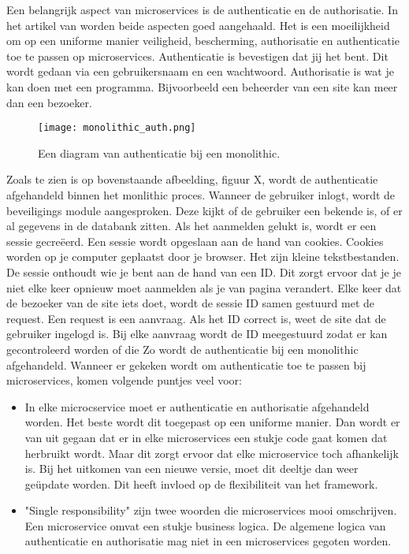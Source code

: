 Een belangrijk aspect van microservices is de authenticatie en de authorisatie. In het artikel van  \textcite{Ayoub2018} worden beide aspecten goed aangehaald. Het is een moeilijkheid om op een uniforme manier veiligheid, bescherming, authorisatie en authenticatie toe te passen op microservices. Authenticatie is bevestigen dat jij het bent. Dit wordt gedaan via een gebruikersnaam en een wachtwoord. Authorisatie is wat je kan doen met een programma. Bijvoorbeeld een beheerder van een site kan meer dan een bezoeker. 
\begin{figure}[h]
	\texttt{[image: monolithic\_auth.png]}
	\centering
	\caption{Een diagram van authenticatie bij een monolithic. \textcite{Ayoub2018}}
\end{figure}
Zoals te zien is op bovenstaande afbeelding, figuur X, wordt de authenticatie afgehandeld binnen het monlithic proces. Wanneer de gebruiker inlogt, wordt de beveiligings module aangesproken. Deze kijkt of de gebruiker een bekende is, of er al gegevens in de databank zitten. Als het aanmelden gelukt is, wordt er een sessie gecreëerd. Een sessie wordt opgeslaan aan de hand van cookies. Cookies worden op je computer geplaatst door je browser. Het zijn kleine tekstbestanden. De sessie onthoudt wie je bent aan de hand van een ID. Dit zorgt ervoor dat je je niet elke keer opnieuw moet aanmelden als je van pagina verandert.  Elke keer dat de bezoeker van de site iets doet, wordt de sessie ID samen gestuurd met de request. Een request is een aanvraag. Als het ID correct is, weet de site dat de gebruiker ingelogd is. Bij elke aanvraag wordt de ID meegestuurd zodat er kan gecontroleerd worden of die
Zo wordt de authenticatie bij een monolithic afgehandeld.
Wanneer er gekeken wordt om authenticatie toe te passen bij microservices, komen volgende puntjes veel voor:
\begin{itemize}
	\item In elke microcservice moet er authenticatie en authorisatie afgehandeld worden. Het beste wordt dit toegepast op een uniforme manier. Dan wordt er van uit gegaan dat er in elke microservices een stukje code gaat komen dat herbruikt wordt. Maar dit zorgt ervoor dat elke microservice toch afhankelijk is. Bij het uitkomen van een nieuwe versie, moet dit deeltje dan weer geüpdate worden. Dit heeft invloed op de flexibiliteit van het framework.
	\item "Single responsibility" zijn twee woorden die microservices mooi omschrijven. Een microservice omvat een stukje business logica. De algemene logica van authenticatie en authorisatie mag niet in een microservices gegoten worden. 
\end{itemize}
